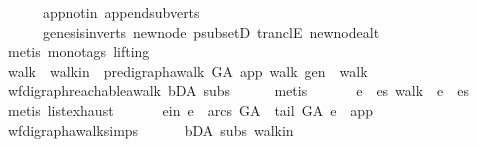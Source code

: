 \begin{isabellebody}
\ \ \ \ \ \ app{\isacharunderscore}{\kern0pt}notin\ append{\isacharunderscore}{\kern0pt}subverts\isanewline
\ \ \ \ \ \ genesis{\isacharunderscore}{\kern0pt}in{\isacharunderscore}{\kern0pt}verts\ new{\isacharunderscore}{\kern0pt}node\ psubsetD\ tranclE\ new{\isacharunderscore}{\kern0pt}node{\isacharunderscore}{\kern0pt}alt\isanewline
\ \ \ \ \isamarkupfalse%
\ {\isacharparenleft}{\kern0pt}metis\ {\isacharparenleft}{\kern0pt}mono{\isacharunderscore}{\kern0pt}tags{\isacharcomma}{\kern0pt}\ lifting{\isacharparenright}{\kern0pt}{\isacharparenright}{\kern0pt}\isanewline
\ \ \isamarkupfalse%
\ \isamarkupfalse%
\ walk\ \ walk{\isacharunderscore}{\kern0pt}in{\isacharcolon}{\kern0pt}\ {\isachardoublequoteopen}\ pre{\isacharunderscore}{\kern0pt}digraph{\isachardot}{\kern0pt}awalk\ G{\isacharunderscore}{\kern0pt}A\ app\ walk\ gen\ {\isasymand}\ walk\ {\isasymnoteq}\ {\isacharbrackleft}{\kern0pt}{\isacharbrackright}{\kern0pt}{\isachardoublequoteclose}\ \isanewline
\ \ \ \ \isamarkupfalse%
\ wf{\isacharunderscore}{\kern0pt}digraph{\isachardot}{\kern0pt}reachable{}{\isacharunderscore}{\kern0pt}awalk\ bD{\isacharunderscore}{\kern0pt}A\ subs{\isacharparenleft}{\kern0pt}{}{\isacharparenright}{\kern0pt}\isanewline
\ \ \ \ \isamarkupfalse%
\ metis\ \isanewline
\ \ \isamarkupfalse%
\ \isamarkupfalse%
\ e\ \ {\isachardoublequoteopen}{\isasymexists}es{\isachardot}{\kern0pt}\ walk\ {\isacharequal}{\kern0pt}\ e\ {\isacharhash}{\kern0pt}\ es{\isachardoublequoteclose}\isanewline
\ \ \ \ \isamarkupfalse%
\ {\isacharparenleft}{\kern0pt}metis\ list{\isachardot}{\kern0pt}exhaust{\isacharparenright}{\kern0pt}\ \isanewline
\ \ \isamarkupfalse%
\ \isamarkupfalse%
\ e{\isacharunderscore}{\kern0pt}in{\isacharcolon}{\kern0pt}\ {\isachardoublequoteopen}e\ {\isasymin}\ arcs\ G{\isacharunderscore}{\kern0pt}A\ {\isasymand}\ tail\ G{\isacharunderscore}{\kern0pt}A\ e\ {\isacharequal}{\kern0pt}\ app{\isachardoublequoteclose}\isanewline
\ \ \ \ \isamarkupfalse%
\ wf{\isacharunderscore}{\kern0pt}digraph{\isachardot}{\kern0pt}awalk{\isacharunderscore}{\kern0pt}simps{\isacharparenleft}{\kern0pt}{}{\isacharparenright}{\kern0pt}\isanewline
\ \ \ \ \ \ bD{\isacharunderscore}{\kern0pt}A\ subs{\isacharparenleft}{\kern0pt}{}{\isacharparenright}{\kern0pt}\ walk{\isacharunderscore}{\kern0pt}in\isanewline
\ \ \ \ \isamarkupfalse%

\end{isabellebody}
